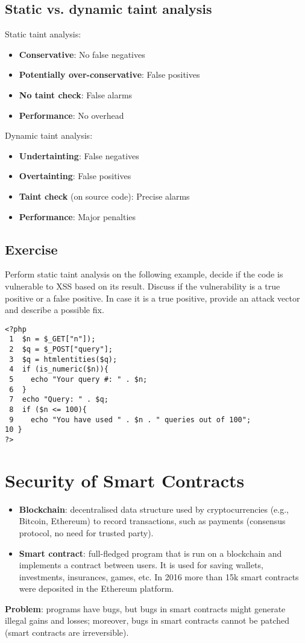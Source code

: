 \documentclass[a4paper, 10pt, titlepage]{article}
\begin{document}
\subsection{Static vs. dynamic taint analysis}
Static taint analysis:
\begin{itemize}
\item \textbf{Conservative}: No false negatives
\item \textbf{Potentially over-conservative}: False positives
\item \textbf{No taint check}: False alarms
\item \textbf{Performance}: No overhead
\end{itemize}
Dynamic taint analysis:
\begin{itemize}
\item \textbf{Undertainting}: False negatives
\item \textbf{Overtainting}: False positives
\item \textbf{Taint check} (on source code): Precise alarms
\item \textbf{Performance}: Major penalties
\end{itemize}

\newpage
\subsection*{Exercise}
Perform static taint analysis on the following example, decide if the code is vulnerable to XSS based on its result. Discuss if the vulnerability is a true positive or a false positive. In case it is a true positive, provide an attack vector and describe a possible fix.
\begin{small}
\begin{lstlisting}
<?php 
 1  $n = $_GET["n"]); 
 2  $q = $_POST["query"]; 
 3  $q = htmlentities($q);
 4  if (is_numeric($n)){
 5    echo "Your query #: " . $n; 
 6  }
 7  echo "Query: " . $q;
 8  if ($n <= 100){
 9    echo "You have used " . $n . " queries out of 100"; 
10 }
?>
\end{lstlisting}
\end{small}

\newpage
\section{Security of Smart Contracts}
\begin{itemize}
\item \textbf{Blockchain}: decentralised data structure used by cryptocurrencies (e.g., Bitcoin, Ethereum) to record transactions, such as payments (consensus protocol, no need for trusted party).
\item \textbf{Smart contract}: full-fledged program that is run on a blockchain and implements a contract between users. It is used for saving wallets, investments, insurances, games, etc. In 2016 more than 15k smart contracts were deposited in the Ethereum platform.
\end{itemize}
\textbf{Problem}: programs have bugs, but bugs in smart contracts might generate illegal gains and losses; moreover, bugs in smart contracts cannot be patched (smart contracts are irreversible).
\end{document}
